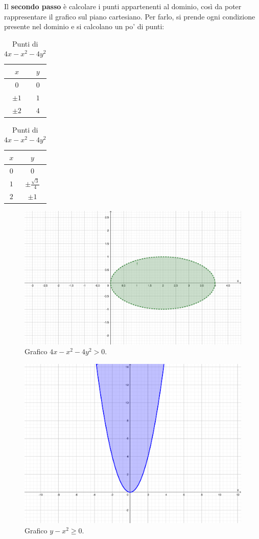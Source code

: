 \documentclass[a4paper]{article}
\begin{document}
	\noindent
	Il \textbf{secondo passo} è calcolare i punti appartenenti al dominio, così da poter rappresentare il grafico sul piano cartesiano. Per farlo, si prende ogni condizione presente nel dominio e si calcolano un po' di punti:
	\begin{table}[!htp]
		\begin{minipage}{.5\textwidth}
			\centering
			\begin{tabular}{@{} c | c @{}}
				\toprule
				$x$ & $y$ \\
				\midrule
				$0$	& $0$ 	\\
				$\pm1$ & $1$	\\
				$\pm2$	& $4$	\\
				\bottomrule
			\end{tabular}
			\caption*{Punti di $y-x^{2}$}
		\end{minipage}
		\begin{minipage}{.5\textwidth}
			\centering
			\begin{tabular}{@{} c | c @{}}
				\toprule
				$x$ & $y$ \\
				\midrule
				$0$	& $0$ \\
				$1$ & $\pm\frac{\sqrt{3}}{4}$	\\
				$2$ & $\pm 1$	\\
				\bottomrule
			\end{tabular}
			\caption*{Punti di $4x-x^{2}-4y^{2}$}
		\end{minipage}
	\end{table}
	\begin{figure}[!htp]
		\centering
		\includegraphics[width=.9\textwidth]{img/grafico-ex3-1.pdf}
		\caption*{Grafico $4x-x^{2}-4y^{2} > 0$.}
	\end{figure}

	\begin{figure}[!htp]
		\centering
		\includegraphics[width=.4\textwidth]{img/grafico-ex3-2.pdf}
		\caption*{Grafico $y-x^{2} \ge 0$.}
	\end{figure}\newpage
	
\end{document}

